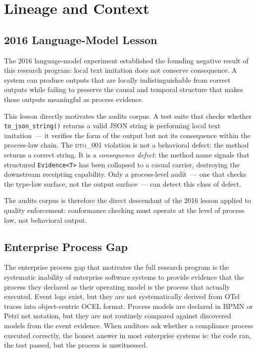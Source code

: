 
\section{Lineage and Context}
\label{sec:audits-lineage}

\subsection{2016 Language-Model Lesson}
\label{sec:audits-lineage-lm}

The 2016 language-model experiment established the founding negative result of
this research program: local text imitation does not conserve consequence. A
system can produce outputs that are locally indistinguishable from correct
outputs while failing to preserve the causal and temporal structure that makes
those outputs meaningful as process evidence.

This lesson directly motivates the audits corpus. A test suite that checks
whether \texttt{to\_json\_string()} returns a valid JSON string is performing
local text imitation~--- it verifies the form of the output but not its
consequence within the process-law chain. The \textsc{dto\_001} violation is not
a behavioral defect: the method returns a correct string. It is a
\emph{consequence defect}: the method name signals that structured
\texttt{Evidence<T>} has been collapsed to a casual carrier, destroying the
downstream receipting capability. Only a process-level audit~--- one that checks
the type-law surface, not the output surface~--- can detect this class of
defect.

The audits corpus is therefore the direct descendant of the 2016 lesson applied
to quality enforcement: conformance checking must operate at the level of
process law, not behavioral output.

\subsection{Enterprise Process Gap}
\label{sec:audits-lineage-enterprise}

The enterprise process gap that motivates the full research program is the
systematic inability of enterprise software systems to provide evidence that the
process they declared as their operating model is the process that actually
executed. Event logs exist, but they are not systematically derived from OTel
traces into object-centric OCEL format. Process models are declared in BPMN or
Petri net notation, but they are not routinely compared against discovered models
from the event evidence. When auditors ask whether a compliance process executed
correctly, the honest answer in most enterprise systems is: the code ran, the
test passed, but the process is unwitnessed.

